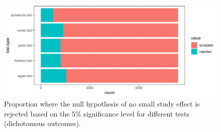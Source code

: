 \documentclass[11pt,a4paper,twoside]{book}\usepackage[]{graphicx}\usepackage[]{color}
\newenvironment{knitrout}{}{} %
\begin{document}

\begin{figure}
\begin{knitrout}
\color{fgcolor}

{\centering \includegraphics[width=\textwidth-3cm]{figure/ch02_figunnamed-chunk-18-1} 

}



\end{knitrout}
\caption{Proportion where the null hypothesis of no small study effect is rejected based on the 5\% significance level for different tests (dichotomous outcomes).}
\label{bias.results.bin}
\end{figure}
\end{document}
